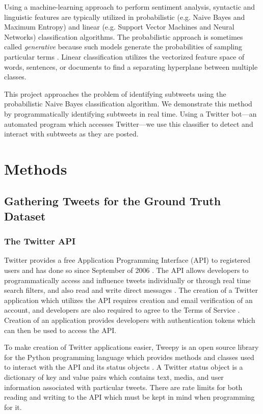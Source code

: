 \documentclass[11pt, twoside, reqno]{book}
\begin{document}
Using a machine-learning approach to perform sentiment analysis, syntactic and linguistic features are typically utilized in probabilistic (e.g. Naive Bayes and Maximum Entropy) and linear (e.g. Support Vector Machines and Neural Networks) classification algorithms. The probabilistic approach is sometimes called \textit{generative} because such models generate the probabilities of sampling particular terms \cite{sentiment_survey}. Linear classification utilizes the vectorized feature space of words, sentences, or documents to find a separating hyperplane between multiple classes.

This project approaches the problem of identifying subtweets using the probabilistic Naive Bayes classification algorithm. We demonstrate this method by programmatically identifying subtweets in real time. Using a Twitter bot---an automated program which accesses Twitter---we use this classifier to detect and interact with subtweets as they are posted.

\chapter{Methods}
\label{methods}

\section{Gathering Tweets for the Ground Truth Dataset}
\label{gathering_tweets}

\subsection{The Twitter API}
\label{twitter_api}

Twitter provides a free Application Programming Interface (API) to registered users and has done so since September of 2006 \cite{twitter_api_start}. The API allows developers to programmatically access and influence tweets individually or through real time search filters, and also read and write direct messages \cite{twitter_api_docs}. The creation of a Twitter application which utilizes the API requires creation and email verification of an account, and developers are also required to agree to the Terms of Service \cite{twitter_tos}. Creation of an application provides developers with authentication tokens which can then be used to access the API.

To make creation of Twitter applications easier, Tweepy \cite{tweepy_python} is an open source library for the Python programming language which provides methods and classes used to interact with the API and its status objects \cite{tweepy_status_object}. A Twitter status object is a dictionary of key and value pairs which contains text, media, and user information associated with particular tweets. There are rate limits for both reading and writing to the API which must be kept in mind when programming for it.
\end{document}
